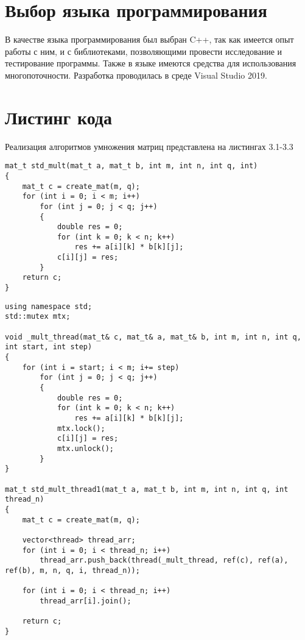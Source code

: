 \section{Выбор языка программирования}
В качестве языка программирования был выбран C++\cite{C++_Doc}, так как имеется опыт работы с ним, и с библиотеками, позволяющими провести исследование и тестирование программы. Также в языке имеются средства для использования многопоточности\cite{Thread}. Разработка проводилась в среде Visual Studio 2019\cite{VisualStudio}.


\section{Листинг кода}
Реализация алгоритмов умножения матриц представлена на листингах 3.1-3.3

\begin{lstlisting}[caption = {Функция однопоточного умножения матриц}, captionpos=b]
mat_t std_mult(mat_t a, mat_t b, int m, int n, int q, int)
{
	mat_t c = create_mat(m, q);
	for (int i = 0; i < m; i++)
		for (int j = 0; j < q; j++)
		{
			double res = 0;
			for (int k = 0; k < n; k++)
				res += a[i][k] * b[k][j];
			c[i][j] = res;
		}
	return c;
}
\end{lstlisting}

\begin{lstlisting}[caption = {Функция умножения матриц (параллельная по строкам)}, captionpos=b]
using namespace std;
std::mutex mtx;

void _mult_thread(mat_t& c, mat_t& a, mat_t& b, int m, int n, int q, int start, int step)
{
	for (int i = start; i < m; i+= step)
		for (int j = 0; j < q; j++)
		{
			double res = 0;
			for (int k = 0; k < n; k++)
				res += a[i][k] * b[k][j];
			mtx.lock();
			c[i][j] = res;
			mtx.unlock();
		}
}

mat_t std_mult_thread1(mat_t a, mat_t b, int m, int n, int q, int thread_n)
{
	mat_t c = create_mat(m, q);
	
	vector<thread> thread_arr;
	for (int i = 0; i < thread_n; i++)
		thread_arr.push_back(thread(_mult_thread, ref(c), ref(a), ref(b), m, n, q, i, thread_n));
	
	for (int i = 0; i < thread_n; i++)
		thread_arr[i].join();
	
	return c;
}
\end{lstlisting}

